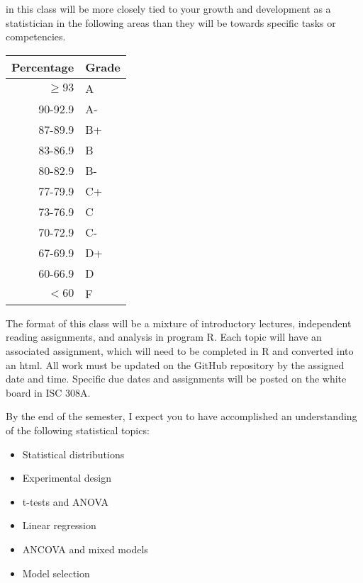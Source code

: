 \documentclass{tufte-handout}
\begin{document}

 in this class will be more closely tied to your growth and development as a statistician in the following areas than they will be towards specific tasks or competencies. 

\begin{margintable}
\begin{tabular}{rl}
Percentage & Grade \\
\hline 
$\ge93$ & A \\
90-92.9 & A- \\
87-89.9 & B+ \\
83-86.9 & B \\
80-82.9 & B- \\
77-79.9 & C+ \\
73-76.9 & C \\
70-72.9 & C- \\
67-69.9 & D+ \\
60-66.9 & D \\
$<60$ & F \\
\hline
\end{tabular}
\end{margintable}

The format of this class will be a mixture of introductory lectures, independent reading assignments, and analysis in program R. Each topic will have an associated assignment, which will need to be completed in R and converted into an html. All work must be updated on the GitHub repository by the assigned date and time. Specific due dates and assignments will be posted on the white board in ISC 308A.

By the end of the semester, I expect you to have accomplished an understanding of the following statistical topics:

\begin{itemize}
	\item Statistical distributions
	\item Experimental design
	\item t-tests and ANOVA
	\item Linear regression
	\item ANCOVA and mixed models
	\item Model selection
\end{itemize}
\end{document}
